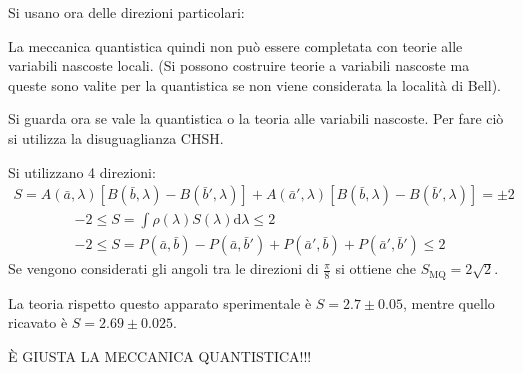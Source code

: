 Si usano ora delle direzioni particolari:


La meccanica quantistica quindi non può essere completata con teorie alle variabili nascoste locali. (Si possono costruire teorie a variabili nascoste ma queste sono valite per la quantistica se non viene considerata la località di Bell).

Si guarda ora se vale la quantistica o la teoria alle variabili nascoste. Per fare ciò si utilizza la disuguaglianza CHSH.

Si utilizzano 4 direzioni:
\begin{equation}\begin{split}
S=A\left(\bar a,\lambda\right)\left[B\left(\bar b,\lambda\right)-B\left(\bar b',\lambda\right)\right]+A\left(\bar a',\lambda\right)\left[B\left(\bar b,\lambda\right)-B\left(\bar b',\lambda\right)\right]=\pm 2
\end{split}\end{equation}
\begin{equation}\begin{split}
-2\le S=\int{\rho\left(\lambda\right)S\left(\lambda\right)\textrm{d}\lambda}\le 2\\
-2\le S=P\left(\bar a,\bar b\right)-P\left(\bar a,\bar b'\right)+P\left(\bar a',\bar b\right)+P\left(\bar a',\bar b'\right)\le 2
\end{split}\end{equation}
Se vengono considerati gli angoli tra le direzioni di $\frac{\pi}{8}$ si ottiene che $S_{\textrm{MQ}}=2\sqrt{2}$.


La teoria rispetto questo apparato sperimentale è $S=2.7\pm 0.05$, mentre quello ricavato è $S=2.69\pm 0.025$.

È GIUSTA LA MECCANICA QUANTISTICA!!!